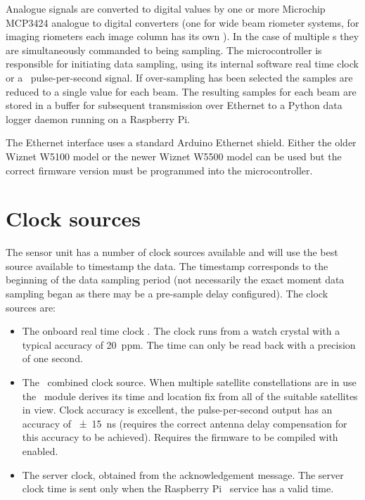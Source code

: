 Analogue signals are converted to digital values by one or more
Microchip MCP3424 analogue to digital converters (one for wide beam
riometer systems, for imaging riometers each image column has its own
\adc). In the case of multiple \adc s they are simultaneously
commanded to being sampling. The microcontroller is responsible for
initiating data sampling, using its internal software real time clock
or a \gnss\ pulse-per-second signal. If over-sampling has been
selected the samples are reduced to a single value for each beam. The
resulting samples for each beam are stored in a buffer for subsequent
transmission over Ethernet to a Python data logger daemon running on a
Raspberry Pi.

The Ethernet interface uses a standard Arduino Ethernet shield. Either
the older Wiznet W5100 model or the newer Wiznet W5500 model can be
used but the correct firmware version must be programmed into the
microcontroller.


\section{Clock sources}

The sensor unit has a number of clock sources available and will use
the best source available to timestamp the data. The timestamp
corresponds to the beginning of the data sampling period (not
necessarily the exact moment data sampling began as there may be a
pre-sample delay configured). The clock sources are:
\begin{itemize}
\item The onboard real time clock \ic. The clock runs from a
   watch crystal with a typical accuracy of
  \SI{20}{ppm}. The time can only be read back with a precision of one
  second.
\item The \gnss\ combined clock source. When multiple satellite
  constellations are in use the \gnss\ module derives its time and
  location fix from all of the suitable satellites in view. Clock
  accuracy is excellent, the pulse-per-second output has an accuracy
  of \SI{\pm15}{\nano\second} (requires the correct antenna delay
  compensation for this accuracy to be achieved). Requires the
  firmware to be compiled with  enabled.
\item The server clock, obtained from the acknowledgement message. The
  server clock time is sent only when the Raspberry Pi \ntp\ service
  has a valid time.
\end{itemize}


